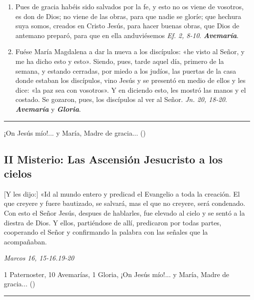 \documentclass[./rosary.tex]{subfiles}
\begin{document}
\begin{enumerate}
      \item Pues de gracia habéis sido salvados por la fe, y esto no os viene de vosotros, es don de Dios; no viene de las obras, para que nadie se gloríe; que hechura suya somos,
            creados en Cristo Jesús, para hacer buenas obras, que Dios de antemano preparó, para que en ella anduviésemos \emph{Ef. 2, 8-10}. \textbf{\emph{Avemaría}}.

      \item Fuése María Magdalena a dar la nueva a los discípulos: «he visto al Señor, y me ha dicho esto y esto». Siendo, pues, tarde aquel día, primero de la semana, y estando cerradas,
            por miedo a los judíos, las puertas de la casa donde estaban los discípulos, vino Jesús y se presentó en medio de ellos y les dice: «la paz sea con vosotros». Y en diciendo esto,
            les mostró las manos y el costado. Se gozaron, pues, los discípulos al ver al Señor. \emph{Jn. 20, 18-20}. \textbf{\emph{Avemaría}} y \textbf{\emph{Gloria}}.
\end{enumerate}

\rule{\textwidth}{0.5pt}
¡On Jesús mío!... y María, Madre de gracia... ()

\subsection*{II Misterio: Las Ascensión Jesucristo a los cielos}

[Y les dijo:] «Id al mundo entero y predicad el Evangelio a toda la creación. El que creyere y fuere bautizado,
se salvará, mas el que no creyere, será condenado. Con esto el Señor Jesús, despues de hablarles,
fue elevado al cielo y se sentó a la diestra de Dios. Y ellos, partiéndose de allí,
predicaron por todas partes, cooperando el Señor y confirmando la palabra con las señales que la acompañaban.

\begin{flushright}
      \emph{Marcos 16, 15-16.19-20}
\end{flushright}

1 Paternoster, 10 Avemarías, 1 Gloria, ¡On Jesús mío!... y María, Madre de gracia... ()

\rule{\textwidth}{0.5pt}
\end{document}
